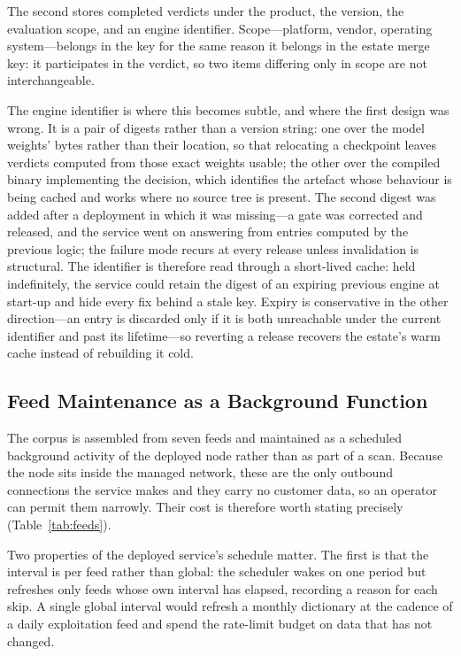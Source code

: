 \documentclass[fleqn,10pt,lineno]{wlpeerj}
\begin{document}
The second stores completed verdicts under the product, the version, the evaluation scope, and an engine identifier. Scope---platform, vendor, operating system---belongs in the key for the same reason it belongs in the estate merge key: it participates in the verdict, so two items differing only in scope are not interchangeable.

The engine identifier is where this becomes subtle, and where the first design was wrong. It is a pair of digests rather than a version string: one over the model weights' bytes rather than their location, so that relocating a checkpoint leaves verdicts computed from those exact weights usable; the other over the compiled binary implementing the decision, which identifies the artefact whose behaviour is being cached and works where no source tree is present. The second digest was added after a deployment in which it was missing---a gate was corrected and released, and the service went on answering from entries computed by the previous logic; the failure mode recurs at every release unless invalidation is structural. The identifier is therefore read through a short-lived cache: held indefinitely, the service could retain the digest of an expiring previous engine at start-up and hide every fix behind a stale key. Expiry is conservative in the other direction---an entry is discarded only if it is both unreachable under the current identifier and past its lifetime---so reverting a release recovers the estate's warm cache instead of rebuilding it cold.

\subsection{Feed Maintenance as a Background Function}
\label{sec:feeds}
The corpus is assembled from seven feeds and maintained as a scheduled background activity of the deployed node rather than as part of a scan. Because the node sits inside the managed network, these are the only outbound connections the service makes and they carry no customer data, so an operator can permit them narrowly. Their cost is therefore worth stating precisely (Table~\ref{tab:feeds}).



Two properties of the deployed service's schedule matter. The first is that the interval is per feed rather than global: the scheduler wakes on one period but refreshes only feeds whose own interval has elapsed, recording a reason for each skip. A single global interval would refresh a monthly dictionary at the cadence of a daily exploitation feed and spend the rate-limit budget on data that has not changed.
\end{document}
